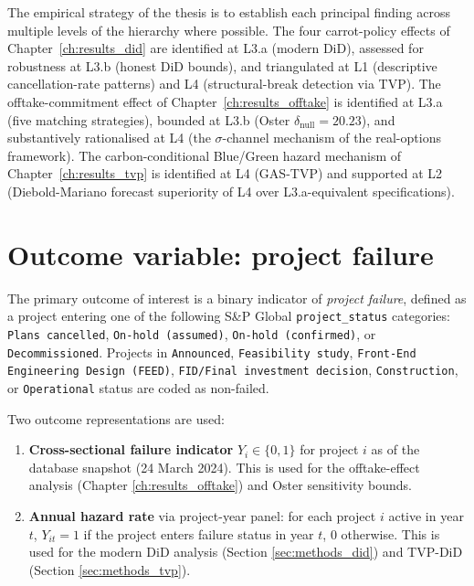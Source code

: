 The empirical strategy of the thesis is to establish each principal finding across multiple levels of the hierarchy where possible. The four carrot-policy effects of Chapter~\ref{ch:results_did} are identified at L3.a (modern DiD), assessed for robustness at L3.b (honest DiD bounds), and triangulated at L1 (descriptive cancellation-rate patterns) and L4 (structural-break detection via TVP). The offtake-commitment effect of Chapter~\ref{ch:results_offtake} is identified at L3.a (five matching strategies), bounded at L3.b (Oster $\delta_{\text{null}} = 20.23$), and substantively rationalised at L4 (the $\sigma$-channel mechanism of the real-options framework). The carbon-conditional Blue/Green hazard mechanism of Chapter~\ref{ch:results_tvp} is identified at L4 (GAS-TVP) and supported at L2 (Diebold-Mariano forecast superiority of L4 over L3.a-equivalent specifications).

\section{Outcome variable: project failure}
\label{sec:methods_outcome}

The primary outcome of interest is a binary indicator of \emph{project failure}, defined as a project entering one of the following S\&P Global \texttt{project\_status} categories: \texttt{Plans cancelled}, \texttt{On-hold (assumed)}, \texttt{On-hold (confirmed)}, or \texttt{Decommissioned}. Projects in \texttt{Announced}, \texttt{Feasibility study}, \texttt{Front-End Engineering Design (FEED)}, \texttt{FID/Final investment decision}, \texttt{Construction}, or \texttt{Operational} status are coded as non-failed.

Two outcome representations are used:

\begin{enumerate}
\item \textbf{Cross-sectional failure indicator} $Y_i \in \{0,1\}$ for project $i$ as of the database snapshot (24 March 2024). This is used for the offtake-effect analysis (Chapter \ref{ch:results_offtake}) and Oster sensitivity bounds.

\item \textbf{Annual hazard rate} via project-year panel: for each project $i$ active in year $t$, $Y_{it} = 1$ if the project enters failure status in year $t$, $0$ otherwise. This is used for the modern DiD analysis (Section \ref{sec:methods_did}) and TVP-DiD (Section \ref{sec:methods_tvp}).
\end{enumerate}

